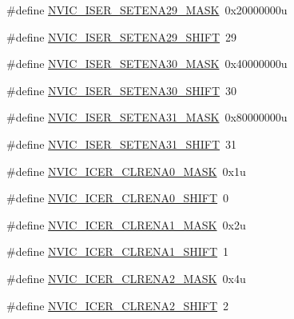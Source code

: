 \begin{DoxyCompactItemize}
\item 
\#define \hyperlink{group___n_v_i_c___register___masks_ga51df809d7d7176779aba04eda0c53cfa}{N\+V\+I\+C\+\_\+\+I\+S\+E\+R\+\_\+\+S\+E\+T\+E\+N\+A29\+\_\+\+M\+A\+SK}~0x20000000u
\item 
\#define \hyperlink{group___n_v_i_c___register___masks_gac07f42744aea8f34a6144f77bb401c4c}{N\+V\+I\+C\+\_\+\+I\+S\+E\+R\+\_\+\+S\+E\+T\+E\+N\+A29\+\_\+\+S\+H\+I\+FT}~29
\item 
\#define \hyperlink{group___n_v_i_c___register___masks_ga7a00f91e688dd92e04740ad3fa3de710}{N\+V\+I\+C\+\_\+\+I\+S\+E\+R\+\_\+\+S\+E\+T\+E\+N\+A30\+\_\+\+M\+A\+SK}~0x40000000u
\item 
\#define \hyperlink{group___n_v_i_c___register___masks_ga83b0c5adc6de369a67b36cc38ae7209d}{N\+V\+I\+C\+\_\+\+I\+S\+E\+R\+\_\+\+S\+E\+T\+E\+N\+A30\+\_\+\+S\+H\+I\+FT}~30
\item 
\#define \hyperlink{group___n_v_i_c___register___masks_gaa2d8198df9296263de4f8db7d8727815}{N\+V\+I\+C\+\_\+\+I\+S\+E\+R\+\_\+\+S\+E\+T\+E\+N\+A31\+\_\+\+M\+A\+SK}~0x80000000u
\item 
\#define \hyperlink{group___n_v_i_c___register___masks_gaf4e9b881377e0dd1f51a1551bfdb7f47}{N\+V\+I\+C\+\_\+\+I\+S\+E\+R\+\_\+\+S\+E\+T\+E\+N\+A31\+\_\+\+S\+H\+I\+FT}~31
\item 
\#define \hyperlink{group___n_v_i_c___register___masks_gaabfb09a9154cc1a657e4537e68c9702a}{N\+V\+I\+C\+\_\+\+I\+C\+E\+R\+\_\+\+C\+L\+R\+E\+N\+A0\+\_\+\+M\+A\+SK}~0x1u
\item 
\#define \hyperlink{group___n_v_i_c___register___masks_gaec9c9550c79d3cbb214be9a5affd43ec}{N\+V\+I\+C\+\_\+\+I\+C\+E\+R\+\_\+\+C\+L\+R\+E\+N\+A0\+\_\+\+S\+H\+I\+FT}~0
\item 
\#define \hyperlink{group___n_v_i_c___register___masks_ga02923223d4ab8e570a33f792d61895a9}{N\+V\+I\+C\+\_\+\+I\+C\+E\+R\+\_\+\+C\+L\+R\+E\+N\+A1\+\_\+\+M\+A\+SK}~0x2u
\item 
\#define \hyperlink{group___n_v_i_c___register___masks_ga6ee84fb6f0739e8d469cc08c57b382af}{N\+V\+I\+C\+\_\+\+I\+C\+E\+R\+\_\+\+C\+L\+R\+E\+N\+A1\+\_\+\+S\+H\+I\+FT}~1
\item 
\#define \hyperlink{group___n_v_i_c___register___masks_gacbde613b8811acf14f075b5762c5409e}{N\+V\+I\+C\+\_\+\+I\+C\+E\+R\+\_\+\+C\+L\+R\+E\+N\+A2\+\_\+\+M\+A\+SK}~0x4u
\item 
\#define \hyperlink{group___n_v_i_c___register___masks_ga51b776238b56bda3ab1610892fb9c9f8}{N\+V\+I\+C\+\_\+\+I\+C\+E\+R\+\_\+\+C\+L\+R\+E\+N\+A2\+\_\+\+S\+H\+I\+FT}~2
\item 

\end{DoxyCompactItemize}
